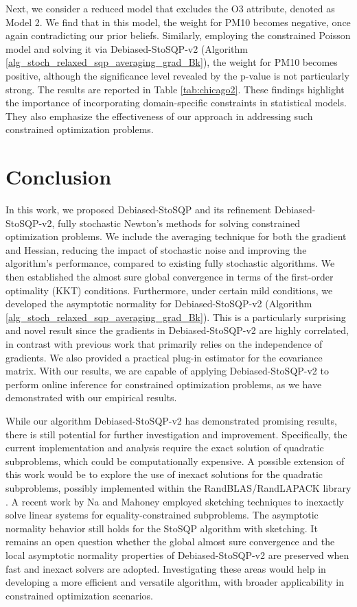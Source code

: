 \documentclass[aos]{imsart}
\numberwithin{equation}{section}
\theoremstyle{plain}
\begin{document}
Next, we consider a reduced model that excludes the O3 attribute, denoted as Model 2. We find that in this model, the weight for PM10 becomes negative, once again contradicting our prior beliefs.
Similarly, employing the constrained Poisson model and solving it via Debiased-StoSQP-v2 (Algorithm \ref{alg_stoch_relaxed_sqp_averaging_grad_Bk}), 
the weight for PM10 becomes positive, although the significance level revealed by the p-value is not particularly strong. The results are reported in Table \ref{tab:chicago2}. 
These findings highlight the importance of incorporating domain-specific constraints in statistical models. They also emphasize the effectiveness of our approach in addressing such constrained optimization problems.


\section{Conclusion}
In this work, we proposed Debiased-StoSQP and its refinement Debiased-StoSQP-v2, 
fully stochastic Newton's methods for solving constrained optimization problems.
We include the averaging technique for both the gradient and Hessian, reducing the impact of stochastic noise and improving the algorithm's performance, compared to existing fully stochastic algorithms. 
We then established the almost sure global convergence in terms of the first-order optimality (KKT) conditions. 
Furthermore, under certain mild conditions, we developed the asymptotic normality for Debiased-StoSQP-v2 (Algorithm \ref{alg_stoch_relaxed_sqp_averaging_grad_Bk}).
This is a particularly surprising and novel result since the gradients in Debiased-StoSQP-v2 are highly correlated, in contrast with previous work that primarily relies on the independence of gradients. 
We also provided a practical plug-in estimator for the covariance matrix. 
With our results, we are capable of applying Debiased-StoSQP-v2 to perform online inference for constrained optimization problems, as we have demonstrated with our empirical results. 



While our algorithm Debiased-StoSQP-v2 has demonstrated promising results, there is still potential for further investigation and improvement. 
Specifically, the current implementation and analysis require the exact solution of quadratic subproblems, which could be computationally expensive. 
A possible extension of this work would be to explore the use of inexact solutions for the quadratic subproblems, possibly implemented within the RandBLAS/RandLAPACK library \cite{randlapack_book_v2_arxiv}. 
A recent work by Na and Mahoney \cite{na2022asymptotic} employed sketching techniques to inexactly solve linear systems for equality-constrained subproblems. 
The asymptotic normality behavior still holds for the StoSQP algorithm with sketching. 
It remains an open question whether the global almost sure convergence and the local asymptotic normality properties of Debiased-StoSQP-v2 are preserved when fast and inexact solvers are adopted.
Investigating these areas would help in developing a more efficient and versatile algorithm, with broader applicability in constrained optimization scenarios.
\end{document}
